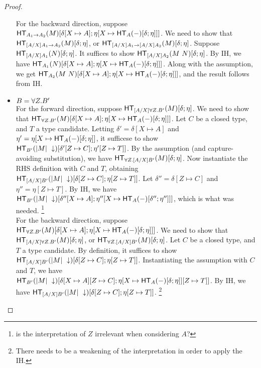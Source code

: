 \documentclass{article}
\begin{document}
\begin{proof}
\begin{itemize}
For the backward direction, suppose
$\mathsf{HT}_{A_1 \to A_2}(M)[\delta[X \mapsto A];\eta[X \mapsto \mathsf{HT}_{A}(-)[\delta;\eta]]]$.
We need to show that $\mathsf{HT}_{[A/X]A_1 \to A_2}(M)[\delta;\eta]$,
or $\mathsf{HT}_{[A/X]A_1 \to [A/X]A_2}(M)[\delta;\eta]$. Suppose $\mathsf{HT}_{[A/X]A_1}(N)[\delta;\eta]$.
It suffices to show $\mathsf{HT}_{[A/X]A_2}(M\ N)[\delta;\eta]$. By IH, we have
$\mathsf{HT}_{A_1}(N)[\delta[X \mapsto A];\eta[X \mapsto \mathsf{HT}_{A}(-)[\delta;\eta]]]$.
Along with the assumption, we get $\mathsf{HT}_{A_2}(M\ N)[\delta[X \mapsto A];\eta[X \mapsto \mathsf{HT}_{A}(-)[\delta;\eta]]]$, and the result follows from IH.

\item $B = \forall Z. B'$\\
For the forward direction, suppose $\mathsf{HT}_{[A/X]\forall Z. B'}(M)[\delta;\eta]$. We need to show that
$\mathsf{HT}_{\forall Z. B'}(M)[\delta[X \mapsto A];\eta[X \mapsto \mathsf{HT}_{A}(-)[\delta;\eta]]]$. Let $C$ be a closed type,
and $T$ a type candidate. Letting $\delta' = \delta[X \mapsto A]$ and
$\eta' = \eta[X \mapsto \mathsf{HT}_{A}(-)[\delta;\eta]]$, it sufficese to show
$\mathsf{HT}_{B'}(|M|\ \downarrow)[\delta'[Z \mapsto C];\eta'[Z \mapsto T]]$. By the assumption (and
capture-avoiding substitution), we have $\mathsf{HT}_{\forall Z. [A/X]B'}(M)[\delta;\eta]$.
Now instantiate the RHS definition with $C$ and $T$, obtaining
$\mathsf{HT}_{[A/X]B'}(|M|\ \downarrow)[\delta[Z \mapsto C];\eta[Z \mapsto T]]$.
Let $\delta'' = \delta[Z \mapsto C]$ and $\eta'' = \eta[Z \mapsto T]$. By IH, we have
$\mathsf{HT}_{B'}(|M|\ \downarrow)[\delta''[X \mapsto A];\eta''[X \mapsto \mathsf{HT}_{A}(-)[\delta'';\eta'']]]$,
which is what was needed. \footnote{ is the interpretation of $Z$ irrelevant when considering $A$?}\\

For the backward direction, suppose
$\mathsf{HT}_{\forall Z. B'}(M)[\delta[X \mapsto A];\eta[X \mapsto \mathsf{HT}_{A}(-)[\delta;\eta]]]$.
We need to show that $\mathsf{HT}_{[A/X]\forall Z. B'}(M)[\delta;\eta]$, or $\mathsf{HT}_{\forall Z. [A/X]B'}(M)[\delta;\eta]$.
Let $C$ be a closed type, and $T$ a type candidate. By definition, it suffices
to show $\mathsf{HT}_{[A/X]B'}(|M|\ \downarrow)[\delta[Z \mapsto C];\eta[Z \mapsto T]]$.
Instantiating the assumption with $C$ and $T$, we have $\mathsf{HT}_{B'}(|M|\ \downarrow)[\delta[X \mapsto A][Z \mapsto C];\eta[X \mapsto \mathsf{HT}_{A}(-)[\delta;\eta]][Z \mapsto T]]$.
By IH, we have $\mathsf{HT}_{[A/X]B'}(|M|\ \downarrow)[\delta[Z \mapsto C];\eta[Z \mapsto T]]$. \footnote{There needs to be a weakening of the interpretation in order to apply the IH.}
\end{itemize}
\end{proof}
\end{document}
